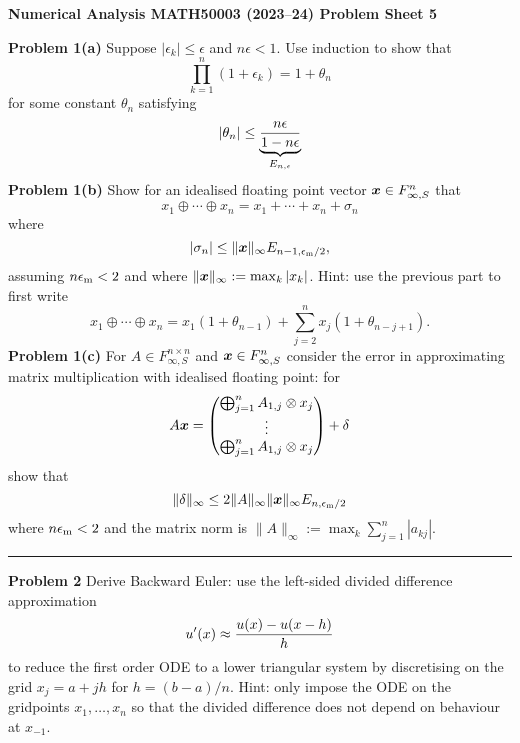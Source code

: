 \documentclass[12pt,a4paper]{article}
\def\endash{–}
\def\x{ {\vc x} }
\begin{document}
\textbf{Numerical Analysis MATH50003 (2023\ensuremath{\endash}24) Problem Sheet 5}

\textbf{Problem 1(a)}  Suppose $|\ensuremath{\epsilon}_k| \ensuremath{\leq} \ensuremath{\epsilon}$ and $n \ensuremath{\epsilon} < 1$. Use induction to show that
\[
\ensuremath{\prod}_{k=1}^n (1+\ensuremath{\epsilon}_k) = 1+\ensuremath{\theta}_n
\]
for some constant $\ensuremath{\theta}_n$ satisfying
\[
|\ensuremath{\theta}_n| \ensuremath{\leq} \underbrace{n \ensuremath{\epsilon} \over 1-n\ensuremath{\epsilon}}_{E_{n,\ensuremath{\epsilon}}}
\]
\textbf{Problem 1(b)} Show for an idealised floating point vector $\ensuremath{\bm{\x}} \ensuremath{\in} F_{\ensuremath{\infty},S}^n$  that
\[
x_1 \ensuremath{\oplus} \ensuremath{\cdots} \ensuremath{\oplus} x_n = x_1 +  \ensuremath{\cdots} + x_n + \ensuremath{\sigma}_n
\]
where
\[
|\ensuremath{\sigma}_n| \ensuremath{\leq} \| \ensuremath{\bm{\x}} \|_\ensuremath{\infty} E_{n-1,\ensuremath{\epsilon}_{\rm m}/2},
\]
assuming $n \ensuremath{\epsilon}_{\rm m} < 2$ and where $\|\ensuremath{\bm{\x}}\|_\ensuremath{\infty} := \max_k |x_k|$. Hint: use the previous part to first write
\[
x_1 \ensuremath{\oplus} \ensuremath{\cdots} \ensuremath{\oplus} x_n = x_1(1+\ensuremath{\theta}_{n-1}) + \ensuremath{\sum}_{j=2}^n x_j (1 + \ensuremath{\theta}_{n-j+1}).
\]
\textbf{Problem 1(c)} For $A \ensuremath{\in} F_{\ensuremath{\infty},S}^{n \ensuremath{\times} n}$ and $\ensuremath{\bm{\x}} \ensuremath{\in} F_{\ensuremath{\infty},S}^n$ consider the error in approximating matrix multiplication with idealised floating point: for
\[
A \ensuremath{\bm{\x}} =  \begin{pmatrix}
\ensuremath{\bigoplus}_{j=1}^n A_{1,j} \ensuremath{\otimes} x_j\\
\ensuremath{\vdots} \\
\ensuremath{\bigoplus}_{j=1}^n A_{1,j} \ensuremath{\otimes} x_j
\end{pmatrix} + \ensuremath{\delta}
\]
show that
\[
\| \ensuremath{\delta} \|_\ensuremath{\infty} \ensuremath{\leq} 2 \|A\|_\ensuremath{\infty} \| \ensuremath{\bm{\x}} \|_\ensuremath{\infty} E_{n,\ensuremath{\epsilon}_{\rm m}/2}
\]
where  $n \ensuremath{\epsilon}_{\rm m} < 2$ and the matrix norm is $\|A \|_\ensuremath{\infty} := \max_k \ensuremath{\sum}_{j=1}^n |a_{kj}|$.

\rule{\textwidth}{1pt}
\textbf{Problem 2} Derive  Backward Euler: use the left-sided divided difference approximation
\[
u'(x) \ensuremath{\approx} {u(x) - u(x-h)  \over h}
\]
to reduce the first order ODE
to a lower triangular system by discretising on the grid $x_j = a + j h$ for $h = (b-a)/n$. Hint: only impose the ODE on the gridpoints $x_1,\ensuremath{\ldots},x_n$ so that the divided difference does not depend on behaviour at $x_{-1}$.
\end{document}
